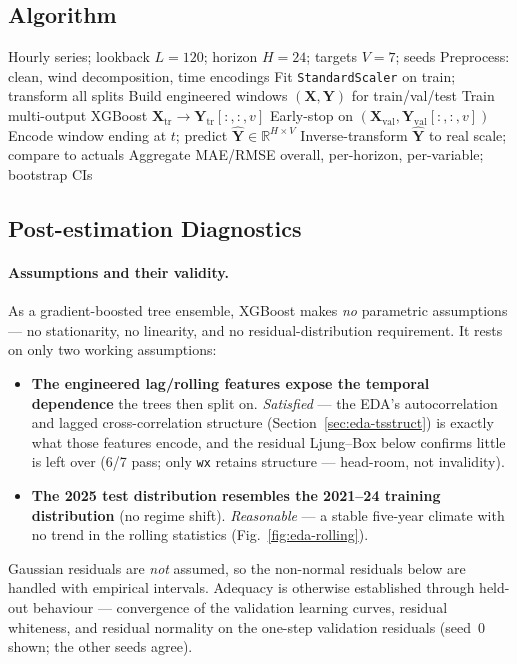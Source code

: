 \documentclass[12pt,a4paper,oneside]{report}
\begin{document}
\subsection{Algorithm}
\label{sec:xgb-algo}
\begin{algorithm}[H]
\caption{XGBoost direct multi-horizon forecasting (training + rolling evaluation)}
\label{alg:xgb}
\begin{algorithmic}[1]
\Require Hourly series; lookback $L=120$; horizon $H=24$; targets $V=7$; seeds
\State Preprocess: clean, wind decomposition, time encodings
\State Fit \texttt{StandardScaler} on train; transform all splits
\State Build engineered windows $(\mathbf{X}, \mathbf{Y})$ for train/val/test
    \State Train multi-output XGBoost $\mathbf{X}_{\text{tr}} \!\to\! \mathbf{Y}_{\text{tr}}[:,:,v]$
    \State Early-stop on $(\mathbf{X}_{\text{val}}, \mathbf{Y}_{\text{val}}[:,:,v])$
  \EndFor
\EndFor
{} 
  \State Encode window ending at $t$; predict $\hat{\mathbf{Y}} \in \mathbb{R}^{H\times V}$
  \State Inverse-transform $\hat{\mathbf{Y}}$ to real scale; compare to actuals
\EndFor
\State Aggregate MAE/RMSE overall, per-horizon, per-variable; bootstrap CIs
\end{algorithmic}
\end{algorithm}

\subsection{Post-estimation Diagnostics}
\label{sec:xgb-diag}
\paragraph{Assumptions and their validity.}
As a gradient-boosted tree ensemble, XGBoost makes \emph{no} parametric assumptions
--- no stationarity, no linearity, and no residual-distribution requirement. It rests
on only two working assumptions:
\begin{itemize}
  \item \textbf{The engineered lag/rolling features expose the temporal dependence}
        the trees then split on. \emph{Satisfied} --- the EDA's autocorrelation and
        lagged cross-correlation structure (Section~\ref{sec:eda-tsstruct}) is exactly
        what those features encode, and the residual Ljung--Box below confirms little
        is left over (6/7 pass; only \texttt{wx} retains structure --- head-room, not
        invalidity).
  \item \textbf{The 2025 test distribution resembles the 2021--24 training
        distribution} (no regime shift). \emph{Reasonable} --- a stable five-year
        climate with no trend in the rolling statistics (Fig.~\ref{fig:eda-rolling}).
\end{itemize}
Gaussian residuals are \emph{not} assumed, so the non-normal residuals below are
handled with empirical intervals. Adequacy is otherwise established through held-out
behaviour --- convergence of the validation learning curves, residual whiteness, and
residual normality on the one-step validation residuals (seed~0 shown; the other
seeds agree).
\end{document}
